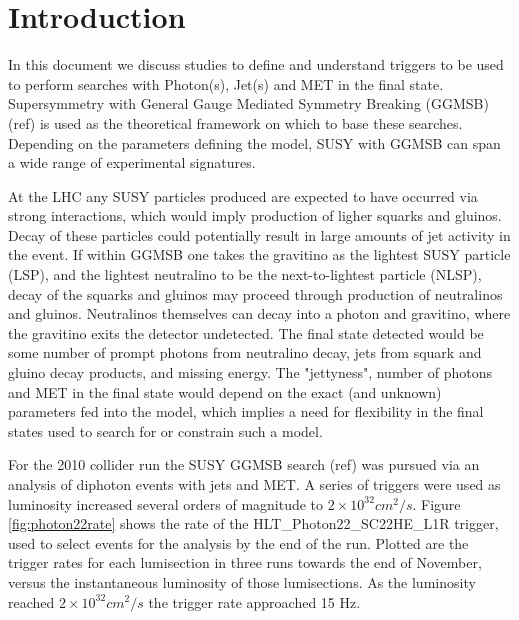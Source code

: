 \section{Introduction}

In this document we discuss studies to define and understand triggers to be used to perform
searches with Photon(s), Jet(s) and MET in the final state.  Supersymmetry with General Gauge Mediated 
Symmetry Breaking (GGMSB) (ref) is used as the theoretical framework on which to base these searches.
Depending on the parameters defining the model, SUSY with GGMSB can span a wide range of experimental
signatures.  

At the LHC any SUSY particles produced are expected to have occurred via strong interactions, which would
imply production of ligher squarks and gluinos.  Decay of these particles could potentially result
in large amounts of jet activity in the event.  If within GGMSB one takes the gravitino as the lightest 
SUSY particle (LSP), and the lightest neutralino to be the next-to-lightest particle (NLSP), decay
of the squarks and gluinos may proceed through production of neutralinos and gluinos.  Neutralinos 
themselves can decay into a photon and gravitino, where the gravitino exits the detector undetected.
The final state detected would be some number of prompt photons from neutralino decay, jets from squark
and gluino decay products, and missing energy.  The "jettyness", number of photons and MET in the 
final state would depend on the exact (and unknown) parameters fed into the model, which implies a 
need for flexibility in the final states used to search for or constrain such a model.

For the 2010 collider run the SUSY GGMSB search (ref) was pursued via an analysis of diphoton events
with jets and MET.  A series of triggers were used as luminosity increased several orders of magnitude 
to $2\times10^{32} cm^2/s$.  Figure \ref{fig:photon22rate} shows the rate of the 
HLT\_Photon22\_SC22HE\_L1R trigger, used to select events for the analysis by the end of the run.  
Plotted are the trigger rates for each lumisection in three runs towards the end of November,
versus the instantaneous luminosity of those lumisections.  As the luminosity reached $2\times10^{32} cm^2/s$
the trigger rate approached 15 Hz.  

